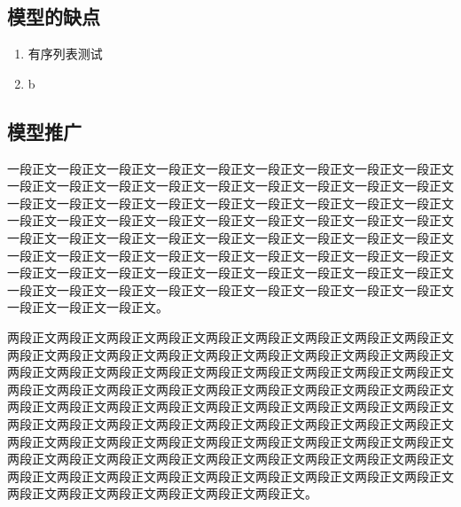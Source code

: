 \documentclass{cumcmthesis}
\begin{document}
\subsection{模型的缺点}
\begin{enumerate}
    \item 有序列表测试
    \item b
\end{enumerate}
\subsection{模型推广}
一段正文一段正文一段正文一段正文一段正文一段正文一段正文一段正文一段正文一段正文一段正文一段正文一段正文一段正文一段正文一段正文一段正文一段正文一段正文一段正文一段正文一段正文一段正文一段正文一段正文一段正文一段正文一段正文一段正文一段正文一段正文一段正文一段正文一段正文一段正文一段正文一段正文一段正文一段正文一段正文一段正文一段正文一段正文一段正文一段正文一段正文一段正文一段正文一段正文一段正文一段正文一段正文一段正文一段正文一段正文一段正文一段正文一段正文一段正文一段正文一段正文一段正文一段正文一段正文一段正文一段正文一段正文一段正文一段正文一段正文一段正文一段正文一段正文一段正文一段正文。
\par 两段正文两段正文两段正文两段正文两段正文两段正文两段正文两段正文两段正文两段正文两段正文两段正文两段正文两段正文两段正文两段正文两段正文两段正文两段正文两段正文两段正文两段正文两段正文两段正文两段正文两段正文两段正文两段正文两段正文两段正文两段正文两段正文两段正文两段正文两段正文两段正文两段正文两段正文两段正文两段正文两段正文两段正文两段正文两段正文两段正文两段正文两段正文两段正文两段正文两段正文两段正文两段正文两段正文两段正文两段正文两段正文两段正文两段正文两段正文两段正文两段正文两段正文两段正文两段正文两段正文两段正文两段正文两段正文两段正文两段正文两段正文两段正文两段正文两段正文两段正文两段正文两段正文两段正文两段正文两段正文两段正文两段正文两段正文两段正文两段正文两段正文两段正文。



\end{document}
